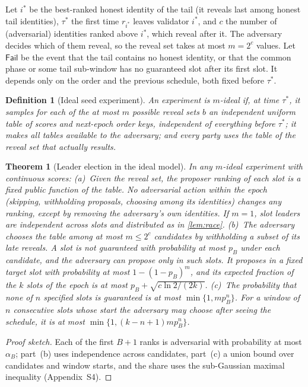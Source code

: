 \documentclass[10pt,journal,compsoc]{IEEEtran}
\theoremstyle{tplain}
\newtheorem{theorem}{Theorem}
\theoremstyle{tdef}
\newtheorem{definition}{Definition}
\theoremstyle{remark}
\newcommand{\supp}[1]{Appendix~#1}
\begin{document}
Let $i^\ast$ be the best-ranked honest identity of the tail (it reveals last among honest tail identities), $\tau^\ast$ the first time $r_{i^\ast}$ leaves validator $i^\ast$, and $c$ the number of (adversarial) identities ranked above $i^\ast$, which reveal after it. The adversary decides which of them reveal, so the reveal set takes at most $m=2^c$ values. Let $\mathsf{Fail}$ be the event that the tail contains no honest identity, or that the common phase or some tail sub-window has no guaranteed slot after its first slot. It depends only on the order and the previous schedule, both fixed before $\tau^\ast$.

\begin{definition}[Ideal seed experiment]\label{def:ideal}
An experiment is \emph{$m$-ideal} if, at time $\tau^\ast$, it samples for each of the at most $m$ possible reveal sets $b$ an independent uniform table of scores and next-epoch order keys, independent of everything before $\tau^\ast$; it makes all tables available to the adversary; and every party uses the table of the reveal set that actually results.
\end{definition}

\begin{theorem}[Leader election in the ideal model]\label{thm:schedule}
In any $m$-ideal experiment with continuous scores: (a)~Given the reveal set, the proposer ranking of each slot is a fixed public function of the table. No adversarial action within the epoch (skipping, withholding proposals, choosing among its identities) changes any ranking, except by removing the adversary's own identities. If $m=1$, slot leaders are independent across slots and distributed as in \cref{lem:race}. (b)~The adversary chooses the table among at most $m\le 2^c$ candidates by withholding a subset of its late reveals. A slot is not guaranteed with probability at most $p_B$ under each candidate, and the adversary can propose only in such slots. It proposes in a fixed target slot with probability at most $1-(1-p_B)^m$, and its expected fraction of the $k$ slots of the epoch is at most $p_B+\sqrt{c\ln 2/(2k)}$. (c)~The probability that none of $n$ specified slots is guaranteed is at most $\min\{1,mp_B^{n}\}$. For a window of $n$ consecutive slots whose start the adversary may choose after seeing the schedule, it is at most $\min\{1,(k-n+1)mp_B^{n}\}$.
\end{theorem}
\begin{proof}[Proof sketch]
Each of the first $B+1$ ranks is adversarial with probability at most $\alpha_B$; part~(b) uses independence across candidates, part~(c) a union bound over candidates and window starts, and the share uses the sub-Gaussian maximal inequality (\supp{S4}).
\end{proof}
\end{document}
